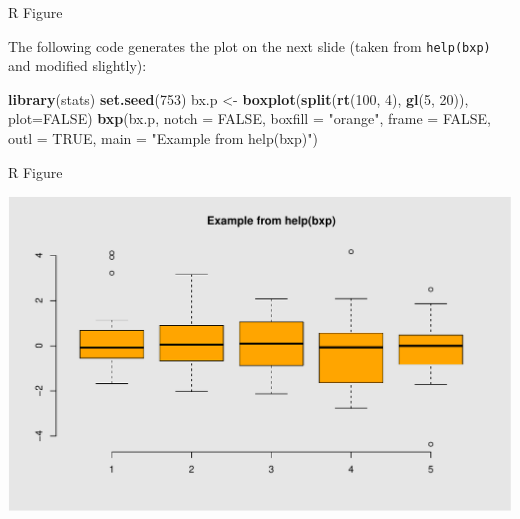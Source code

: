 \documentclass[14pt,ignorenonframetext,compress]{beamer}
\newenvironment{Shaded}{\begin{snugshade}}{\end{snugshade}}
\newcommand{\DataTypeTok}[1]{\textcolor[rgb]{0.13,0.29,0.53}{#1}}
\newcommand{\DecValTok}[1]{\textcolor[rgb]{0.00,0.00,0.81}{#1}}
\newcommand{\KeywordTok}[1]{\textcolor[rgb]{0.13,0.29,0.53}{\textbf{#1}}}
\newcommand{\NormalTok}[1]{#1}
\newcommand{\OtherTok}[1]{\textcolor[rgb]{0.56,0.35,0.01}{#1}}
\newcommand{\StringTok}[1]{\textcolor[rgb]{0.31,0.60,0.02}{#1}}
\renewenvironment{Shaded}{\color{black}\begin{snugshade}\color{black}}{\end{snugshade}}
\begin{document}
\begin{frame}[fragile]{R Figure}
\protect\hypertarget{r-figure}{}

The following code generates the plot on the next slide (taken from
\texttt{help(bxp)} and modified slightly):

\small

\begin{Shaded}
\begin{Highlighting}[]
\KeywordTok{library}\NormalTok{(stats)}
\KeywordTok{set.seed}\NormalTok{(}\DecValTok{753}\NormalTok{)}
\NormalTok{bx.p <-}\StringTok{ }\KeywordTok{boxplot}\NormalTok{(}\KeywordTok{split}\NormalTok{(}\KeywordTok{rt}\NormalTok{(}\DecValTok{100}\NormalTok{, }\DecValTok{4}\NormalTok{),}
                      \KeywordTok{gl}\NormalTok{(}\DecValTok{5}\NormalTok{, }\DecValTok{20}\NormalTok{)), }\DataTypeTok{plot=}\OtherTok{FALSE}\NormalTok{)}
\KeywordTok{bxp}\NormalTok{(bx.p, }\DataTypeTok{notch =} \OtherTok{FALSE}\NormalTok{, }\DataTypeTok{boxfill =} \StringTok{"orange"}\NormalTok{,}
    \DataTypeTok{frame =} \OtherTok{FALSE}\NormalTok{, }\DataTypeTok{outl =} \OtherTok{TRUE}\NormalTok{,}
    \DataTypeTok{main =} \StringTok{"Example from help(bxp)"}\NormalTok{)}
\end{Highlighting}
\end{Shaded}

\end{frame}

\begin{frame}{R Figure}
\protect\hypertarget{r-figure-1}{}

\includegraphics{Introduction_files/figure-beamer/pressureFig-1.pdf}

\end{frame}
\end{document}
